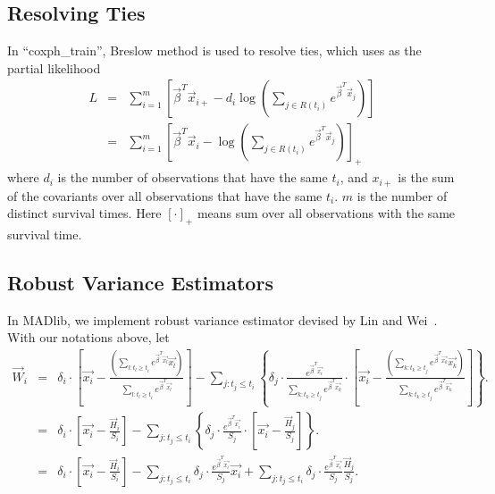 \subsection{Resolving Ties}
In ``coxph\_train'', Breslow method is used to resolve ties, which uses
as the partial likelihood~\cite{hosmer2011applied}
\begin{eqnarray}
  L &=& \sum_{i=1}^{m}\left[ \vec{\beta}^{T} \vec{x}_{i+} - 
    d_i \log\left( \sum_{j \in R(t_i)} e^{\vec{\beta}^T
        \vec{x}_j}\right) \right]\\
  &=& \sum_{i=1}^{m}\left[ \vec{\beta}^{T} \vec{x}_i - \log\left( \sum_{j \in R(t_i)} e^{\vec{\beta}^T
        \vec{x}_j}\right)\right]_{+}
\end{eqnarray}
where $d_i$ is the number of observations that have the same $t_i$,
and $x_{i+}$ is the sum of the covariants over all observations that
have the same $t_i$. $m$ is the number of distinct survival
times. Here $[\cdot]_{+}$ means sum over all observations with the
same survival time.

\subsection{Robust Variance Estimators}
In MADlib, we implement robust variance estimator devised by Lin and Wei~\cite{lin1989robust}.
With our notations above, let
\begin{eqnarray*}
    \vec{W}_{i}
    &=& \delta_i \cdot \left[ \vec{x_i} - \frac{\left( \sum_{l: t_l \ge t_i} e^{\vec{\beta}^T \vec{x_l}} \vec{x_l} \right)}{\sum_{l: t_l \ge t_i} e^{\vec{\beta}^T \vec{x_l}}} \right]
    - \sum_{j: t_j \le t_i} \left\{ \delta_j \cdot \frac{e^{\vec{\beta}^T \vec{x_i}}}{\sum_{k: t_k \ge t_j} e^{\vec{\beta}^T \vec{x_k}}}
    \cdot \left[ \vec{x_i} - \frac{\left( \sum_{k: t_k \ge t_j} e^{\vec{\beta}^T \vec{x_k}} \vec{x_k} \right)}{\sum_{k: t_k \ge t_j} e^{\vec{\beta}^T \vec{x_k}}} \right] \right\}.\\
    &=& \delta_i \cdot \left[ \vec{x_i} - \frac{\vec{H}_i}{S_i} \right]
    - \sum_{j: t_j \le t_i} \left\{ \delta_j \cdot \frac{e^{\vec{\beta}^T \vec{x_i}}}{S_j}
    \cdot \left[ \vec{x_i} - \frac{\vec{H}_j}{S_j} \right] \right\}.\\
    &=& \delta_i \cdot \left[ \vec{x_i} - \frac{\vec{H}_i}{S_i} \right]
    - \sum_{j: t_j \le t_i} \delta_j \cdot \frac{e^{\vec{\beta}^T \vec{x_i}}}{S_j} \vec{x_i}
    + \sum_{j: t_j \le t_i} \delta_j \cdot \frac{e^{\vec{\beta}^T \vec{x_i}}}{S_j} \frac{\vec{H}_j}{S_j}.\\
\end{eqnarray*}

